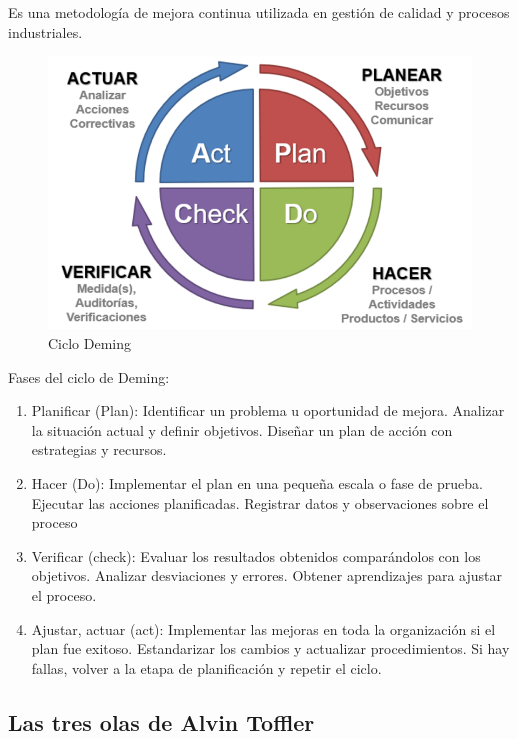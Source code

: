 \documentclass[a4paper,oneside,11pt]{article}
\begin{document}
Es una metodología de mejora continua utilizada en gestión de calidad y procesos industriales.

\begin{figure}[ht!]
    \centering
    \includegraphics[scale=.4]{ciclo_deming.png}
    \caption{Ciclo Deming}
\end{figure}

Fases del ciclo de Deming:

\begin{enumerate}
    \item Planificar (Plan): Identificar un problema u oportunidad de mejora. Analizar la situación actual y definir objetivos. Diseñar un plan de acción con estrategias y recursos.

    \item Hacer (Do): Implementar el plan en una pequeña escala o fase de prueba. Ejecutar las acciones planificadas. Registrar datos y observaciones sobre el proceso

    \item Verificar (check): Evaluar los resultados obtenidos comparándolos con los objetivos. Analizar desviaciones y errores. Obtener aprendizajes para ajustar el proceso.

    \item Ajustar, actuar (act): Implementar las mejoras en toda la organización si el plan fue exitoso. Estandarizar los cambios y actualizar procedimientos. Si hay fallas, volver a la etapa de planificación y repetir el ciclo.
\end{enumerate}

\subsection{Las tres olas de Alvin Toffler}
\end{document}
